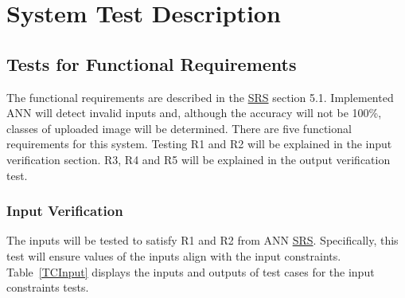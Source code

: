 \documentclass[12pt, titlepage]{article}
\begin{document}


\section{System Test Description}\label{SystemTest}
	
\subsection{Tests for Functional Requirements}

The functional requirements are described in the 
\href{https://github.com/tanya-jp/ANN-CAS741/blob/main/docs/SRS/SRS.pdf}{SRS} section 5.1. 
Implemented ANN will detect invalid inputs and, although the accuracy will not be 100\%,
classes of uploaded image will be determined. There are five functional requirements for
this system. Testing R1 and R2 will be explained in 
the input verification section. R3, R4 and R5 will be
explained in the output verification test.



\subsubsection{Input Verification}

The inputs will be tested to satisfy R1 and R2 from ANN 
\href{https://github.com/tanya-jp/ANN-CAS741/blob/main/docs/SRS/SRS.pdf}{SRS}. Specifically,
this test will ensure values of the inputs align with the input constraints.
Table~\ref{TCInput} displays the inputs and outputs of test cases for the input constraints
tests.
		
\end{document}
